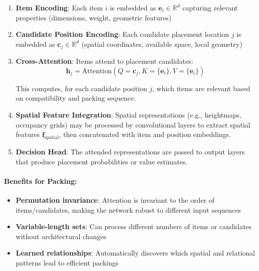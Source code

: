 \begin{enumerate}
\item \textbf{Item Encoding}: Each item $i$ is embedded as $\mathbf{e}_i \in \mathbb{R}^d$ capturing relevant properties (dimensions, weight, geometric features)

\item \textbf{Candidate Position Encoding}: Each candidate placement location $j$ is embedded as $\mathbf{c}_j \in \mathbb{R}^d$ (spatial coordinates, available space, local geometry)

\item \textbf{Cross-Attention}: Items attend to placement candidates:
   \begin{equation}
   \mathbf{h}_j = \text{Attention}(Q=\mathbf{c}_j, K=\{\mathbf{e}_i\}, V=\{\mathbf{e}_i\})
   \end{equation}

   This computes, for each candidate position $j$, which items are relevant based on compatibility and packing sequence.

\item \textbf{Spatial Feature Integration}: Spatial representations (e.g., heightmaps, occupancy grids) may be processed by convolutional layers to extract spatial features $\mathbf{f}_{\text{spatial}}$, then concatenated with item and position embeddings.

\item \textbf{Decision Head}: The attended representations are passed to output layers that produce placement probabilities or value estimates.
\end{enumerate}

\paragraph{Benefits for Packing:}

\begin{itemize}
\item \textbf{Permutation invariance}: Attention is invariant to the order of items/candidates, making the network robust to different input sequences
\item \textbf{Variable-length sets}: Can process different numbers of items or candidates without architectural changes
\item \textbf{Learned relationships}: Automatically discovers which spatial and relational patterns lead to efficient packings
\end{itemize}

